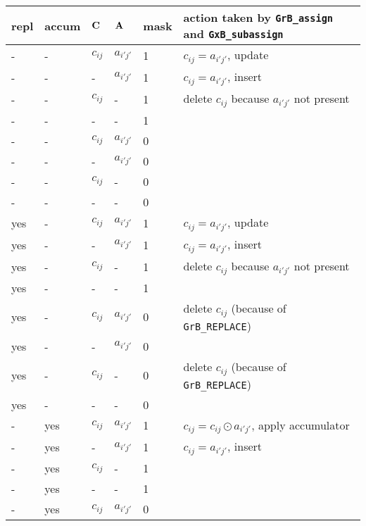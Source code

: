 \documentclass[12pt]{article}
\begin{document}
\begin{table}
{\small
\begin{tabular}{lllll|l}
\hline
repl & accum & ${\bf C}$ & ${\bf A}$ & mask & action taken by \verb'GrB_assign' and \verb'GxB_subassign'\\
\hline
    -  &-   & $c_{ij}$ & $a_{i'j'}$  & 1    &  $c_{ij} = a_{i'j'}$, update \\
    -  &-   &  -       & $a_{i'j'}$  & 1    &  $c_{ij} = a_{i'j'}$, insert \\
    -  &-   & $c_{ij}$ &  -          & 1    &  delete $c_{ij}$ because $a_{i'j'}$ not present \\
    -  &-   &  -       &  -          & 1    &   \\
\hline
    -  &-   & $c_{ij}$ & $a_{i'j'}$  & 0    &   \\
    -  &-   &  -       & $a_{i'j'}$  & 0    &   \\
    -  &-   & $c_{ij}$ &  -          & 0    &   \\
    -  &-   &  -       &  -          & 0    &   \\
\hline
    yes&-   & $c_{ij}$ & $a_{i'j'}$  & 1    &  $c_{ij} = a_{i'j'}$, update \\
    yes&-   &  -       & $a_{i'j'}$  & 1    &  $c_{ij} = a_{i'j'}$, insert \\
    yes&-   & $c_{ij}$ &  -          & 1    &  delete $c_{ij}$ because $a_{i'j'}$ not present \\
    yes&-   &  -       &  -          & 1    &   \\
\hline
    yes&-   & $c_{ij}$ & $a_{i'j'}$  & 0    &  delete $c_{ij}$  (because of \verb'GrB_REPLACE') \\
    yes&-   &  -       & $a_{i'j'}$  & 0    &   \\
    yes&-   & $c_{ij}$ &  -          & 0    &  delete $c_{ij}$  (because of \verb'GrB_REPLACE') \\
    yes&-   &  -       &  -          & 0    &   \\
\hline
    -  &yes & $c_{ij}$ & $a_{i'j'}$  & 1    &  $c_{ij} = c_{ij} \odot a_{i'j'}$, apply accumulator \\
    -  &yes &  -       & $a_{i'j'}$  & 1    &  $c_{ij} = a_{i'j'}$, insert \\
    -  &yes & $c_{ij}$ &  -          & 1    &   \\
    -  &yes &  -       &  -          & 1    &   \\
\hline
    -  &yes & $c_{ij}$ & $a_{i'j'}$  & 0    &   \\

\end{tabular}}
\end{table}
\end{document}
